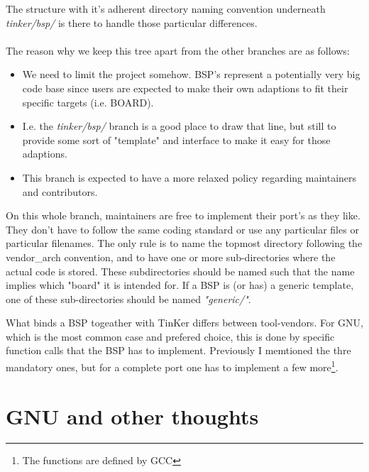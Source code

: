 The structure with it's adherent directory naming convention underneath \textit{tinker/bsp/} is there to handle those particular differences.
\\\\
The reason why we keep this tree apart from the other branches are as follows:
\begin{itemize}
	\item We need to limit the project somehow. BSP's represent a potentially very big code base since users are expected to make their own adaptions to fit their specific targets (i.e. BOARD).
	\item I.e. the \textit{tinker/bsp/} branch is a good place to draw that line, but still to provide some sort of "template" and interface to make it easy for those adaptions.
	\item This branch is expected to have a more relaxed policy regarding maintainers and contributors.
\end{itemize}

On this whole branch, maintainers are free to implement their port's as they like. They don't have to follow the same coding standard or use any particular files or particular filenames. The only rule is to name the topmost directory following the vendor\_arch convention, and to have one or more sub-directories where the actual code is stored. These subdirectories should be named such that the name implies which "board" it is intended for. If a BSP is (or has) a generic template, one of these sub-directories should be named \textit{"generic/"}.

What binds a BSP togeather with TinKer differs between tool-vendors. For GNU, which is the most common case and prefered choice, this is done by specific function calls that the BSP has to implement. Previously I memtioned the thre mandatory ones, but for a complete port one has to implement a few more\footnote{The functions are defined by GCC}.
 
\chapter{GNU and other thoughts}

